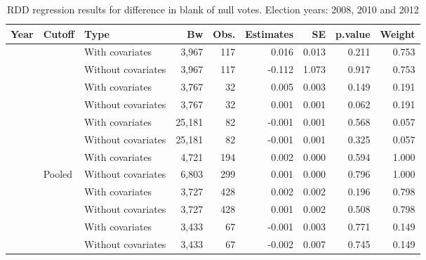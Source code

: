 \documentclass[
  12pt,
]{article}
\begin{document}
\begin{table}[H]

\caption{\label{tab:r.pct.bn.dif}RDD regression results for difference in blank of null votes. Election years: 2008, 2010 and 2012}
\centering
\begin{tabular}[t]{lllrrrrrr}
\toprule
Year & Cutoff & Type & Bw & Obs. & Estimates & SE & p.value & Weight\\
\midrule
 &  & With covariates & 3,967 & 117 & 0.016 & 0.013 & 0.211 & 0.753\\


 & \multirow{-2}{*}{\raggedright\arraybackslash 20000} & Without covariates & 3,967 & 117 & -0.112 & 1.073 & 0.917 & 0.753\\


 &  & With covariates & 3,767 & 32 & 0.005 & 0.003 & 0.149 & 0.191\\


 & \multirow{-2}{*}{\raggedright\arraybackslash 40000} & Without covariates & 3,767 & 32 & 0.001 & 0.001 & 0.062 & 0.191\\


 &  & With covariates & 25,181 & 82 & -0.001 & 0.001 & 0.568 & 0.057\\


 & \multirow{-2}{*}{\raggedright\arraybackslash 60000} & Without covariates & 25,181 & 82 & -0.001 & 0.001 & 0.325 & 0.057\\


 &  & With covariates & 4,721 & 194 & 0.002 & 0.000 & 0.594 & 1.000\\


\multirow{-8}{*}{\raggedright\arraybackslash 2008} & \multirow{-2}{*}{\raggedright\arraybackslash Pooled} & Without covariates & 6,803 & 299 & 0.001 & 0.000 & 0.796 & 1.000\\

\cmidrule{1-9}
 &  & With covariates & 3,727 & 428 & 0.002 & 0.002 & 0.196 & 0.798\\


 & \multirow{-2}{*}{\raggedright\arraybackslash 20000} & Without covariates & 3,727 & 428 & 0.001 & 0.002 & 0.508 & 0.798\\


 &  & With covariates & 3,433 & 67 & -0.001 & 0.003 & 0.771 & 0.149\\


 & \multirow{-2}{*}{\raggedright\arraybackslash 40000} & Without covariates & 3,433 & 67 & -0.002 & 0.007 & 0.745 & 0.149\\



\end{tabular}
\end{table}
\end{document}
